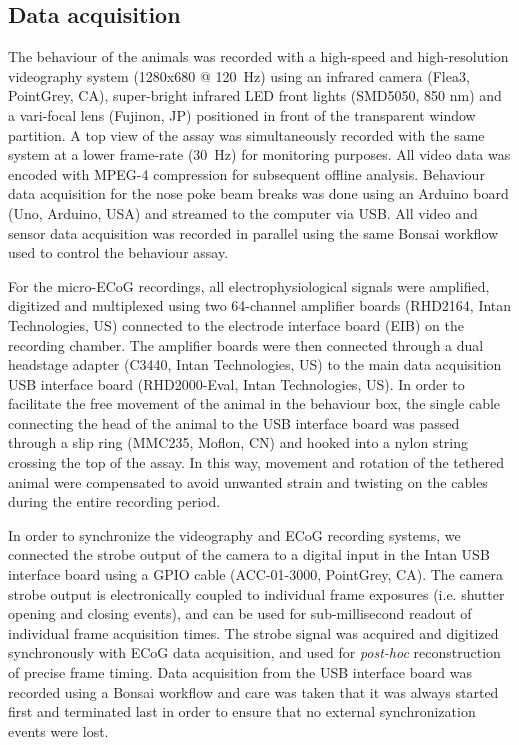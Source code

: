 \subsection{Data acquisition}

The behaviour of the animals was recorded with a high-speed and high-resolution videography system (1280x680 @ \SI{120}{\hertz}) using an infrared camera (Flea3, PointGrey, CA), super-bright infrared LED front lights (SMD5050, 850 nm) and a vari-focal lens (Fujinon, JP) positioned in front of the transparent window partition. A top view of the assay was simultaneously recorded with the same system at a lower frame-rate (\SI{30}{\hertz}) for monitoring purposes. All video data was encoded with MPEG-4 compression for subsequent offline analysis. Behaviour data acquisition for the nose poke beam breaks was done using an Arduino board (Uno, Arduino, USA) and streamed to the computer via USB. All video and sensor data acquisition was recorded in parallel using the same Bonsai workflow used to control the behaviour assay.

For the micro-ECoG recordings, all electrophysiological signals were amplified, digitized and multiplexed using two 64-channel amplifier boards (RHD2164, Intan Technologies, US) connected to the electrode interface board (EIB) on the recording chamber. The amplifier boards were then connected through a dual headstage adapter (C3440, Intan Technologies, US) to the main data acquisition USB interface board (RHD2000-Eval, Intan Technologies, US). In order to facilitate the free movement of the animal in the behaviour box, the single cable connecting the head of the animal to the USB interface board was passed through a slip ring (MMC235, Moflon, CN) and hooked into a nylon string crossing the top of the assay. In this way, movement and rotation of the tethered animal were compensated to avoid unwanted strain and twisting on the cables during the entire recording period.

In order to synchronize the videography and ECoG recording systems, we connected the strobe output of the camera to a digital input in the Intan USB interface board using a GPIO cable (ACC-01-3000, PointGrey, CA). The camera strobe output is electronically coupled to individual frame exposures (i.e. shutter opening and closing events), and can be used for sub-millisecond readout of individual frame acquisition times. The strobe signal was acquired and digitized synchronously with ECoG data acquisition, and used for \emph{post-hoc} reconstruction of precise frame timing. Data acquisition from the USB interface board was recorded using a Bonsai workflow and care was taken that it was always started first and terminated last in order to ensure that no external synchronization events were lost.


